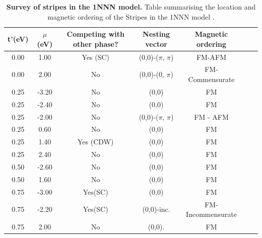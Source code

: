 \documentclass[12pt]{article}
\begin{document}
\begin{table}[h]
    \centering
    \begin{tabular}{|c|c|c|c|c|c|c|}
        \hline
       t'(eV) & $\mu$ (eV) & Competing with other phase?& Nesting vector & Magnetic ordering  \\
        \hline
        0.00 & 1.00 & Yes (SC) & (0,0)-($\pi$, $\pi$)& FM-AFM\\
        \hline
        0.00 & 2.00 &  No  & (0,0)-(0, $\pi$)  & FM-Commensurate\\
        \hline
        0.25 & -3.20 & No  & (0,0)  & FM\\
        \hline
        0.25 & -2.40 & No  & (0,0) & FM\\
        \hline
        0.25 & -2.00 & No  & (0,0)-($\pi$, $\pi$)  & FM - AFM\\
        \hline
        0.25 & 0.60 &  No  & (0,0)  & FM \\
        \hline
        0.25 & 1.40 &  Yes (CDW)  & (0,0)  & FM \\
        \hline
        0.25 & 2.40 &  No  & (0,0)  & FM \\
        \hline
        0.50 & -2.60 &  No  & (0,0)  & FM \\
        \hline
        0.50 & 1.60 &  No  & (0,0)  & FM \\
        \hline
        0.75 & -3.00 &  Yes(SC)  & (0,0)  & FM \\
        \hline
        0.75 & -2.20 &  Yes(SC)  & (0,0)-inc. & FM- Incommensurate \\
        \hline
        0.75 & 2.00 &  No  & (0,0). & FM \\
        \hline


          
        \hline
    \end{tabular}
    \caption{\textbf{Survey of stripes in the 1NNN model.} Table summarising the location and magnetic ordering of the Stripes in the 1NNN model .}
    \label{tab:StripesSummary}
\end{table}
\end{document}
